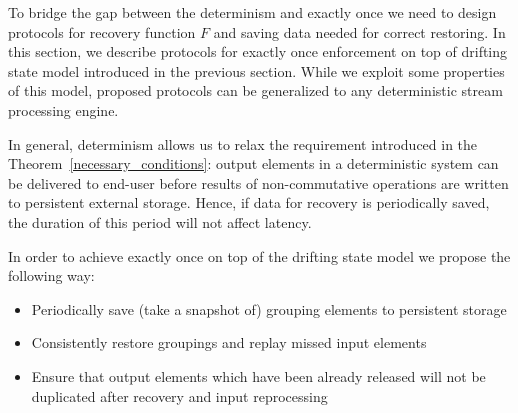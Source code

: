 
\label {fs-consistency-section}

To bridge the gap between the determinism and exactly once we need to design protocols for recovery function $F$ and saving data needed for correct restoring. In this section, we describe protocols for exactly once enforcement on top of drifting state model introduced in the previous section. While we exploit some properties of this model, proposed protocols can be generalized to any deterministic stream processing engine.

In general, determinism allows us to relax the requirement introduced in the Theorem~\ref{necessary_conditions}: output elements in a deterministic system can be delivered to end-user before results of non-commutative operations are written to persistent external storage. Hence, if data for recovery is periodically saved, the duration of this period will not affect latency.

In order to achieve exactly once on top of the drifting state model we propose the following way:
\begin{itemize}
    \item Periodically save (take a snapshot of) grouping elements to persistent storage
    \item Consistently restore groupings and replay missed input elements
    \item Ensure that output elements which have been already released will not be duplicated after recovery and input reprocessing
\end{itemize}

